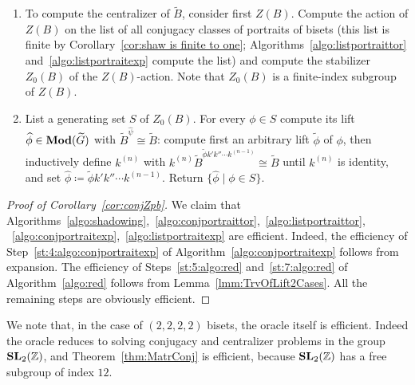 \documentclass{amsart}
\newcommand\wtB{{\widetilde B}}
\newcommand\wtC{{\widetilde C}}
\newcommand\wtG{{\widetilde G}}
\begin{document}
\begin{algo}
\begin{enumerate}
    $k\wtB^{\widetilde\phi}\cong\wtC$. It follows that
    $k$ is a knitting element. Compute inductively $k^{(n)}$ with
    $k^{(n)} \wtB^{\widetilde\phi k' k''\cdots
      k^{(n-1)}}\cong\wtC$; proceed until $k^{(n)}$ is
    identity (this is guaranteed by
    Lemma~\ref{lmm:TrvOfLift2Cases}). Return
    $\widetilde\phi k' k''\cdots k^{(n-1)}$.\label{st:5:algo:red}
  \item To compute the centralizer of $\wtB$, consider first
    $Z(B)$. Compute the action of $Z(B)$ on the list of all conjugacy
    classes of portraits of bisets (this list is finite by
    Corollary~\ref{cor:shaw is finite to one};
    Algorithms~\ref{algo:listportraittor}
    and~\ref{algo:listportraitexp} compute the list) and compute the
    stabilizer $Z_0(B)$ of the $Z(B)$-action. Note that $Z_0(B)$ is a
    finite-index subgroup of $Z(B)$.
  \item List a generating set $S$ of $Z_0(B)$. For every $\phi\in S $
    compute its lift $\widehat\phi\in \Mod(\wtG)$ with
    $\wtB^{\widehat\psi}\cong \wtB$: compute first an
    arbitrary lift $\widetilde\phi$ of $\phi$, then inductively
    define $k^{(n)}$ with
    $k^{(n)} \wtB^{\widetilde\phi k' k''\cdots
      k^{(n-1)}}\cong\wtB$ until $k^{(n)}$ is identity, and
    set
    $\widehat\phi \coloneqq \widetilde\phi k' k''\cdots
    k^{(n-1)}$. Return $\{\widehat\phi\mid \phi\in S\}$.\label{st:7:algo:red}
  \end{enumerate}
\end{algo}

\begin{proof}[Proof of Corollary~\ref{cor:conjZpb}]
  We claim that
  Algorithms~\ref{algo:shadowing},~\ref{algo:conjportraittor},~\ref{algo:listportraittor},
  ~\ref{algo:conjportraitexp},~\ref{algo:listportraitexp} are
  efficient.  Indeed, the efficiency of
  Step~\ref{st:4:algo:conjportraitexp} of
  Algorithm~\ref{algo:conjportraitexp} follows from expansion. The
  efficiency of Steps~\ref{st:5:algo:red} and~\ref{st:7:algo:red} of
  Algorithm~\ref{algo:red} follows from
  Lemma~\ref{lmm:TrvOfLift2Cases}. All the remaining steps are
  obviously efficient.
\end{proof}

We note that, in the case of $(2,2,2,2)$ bisets, the oracle itself is
efficient. Indeed the oracle reduces to solving conjugacy and
centralizer problems in the group $\mathbf{SL}_2({\mathbb Z})$, and
Theorem~\ref{thm:MatrConj} is efficient, because $\mathbf{SL}_2({\mathbb Z})$ has a
free subgroup of index $12$.
\end{document}
